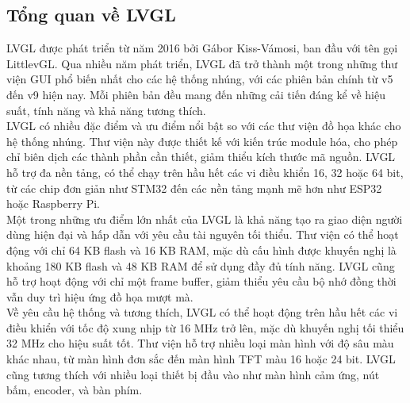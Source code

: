 \subsection{Tổng quan về LVGL}
\tab LVGL được phát triển từ năm 2016 bởi Gábor Kiss-Vámosi, ban đầu với tên gọi LittlevGL. Qua nhiều năm phát triển, LVGL đã trở thành một trong những thư viện GUI phổ biến nhất cho các hệ thống nhúng, với các phiên bản chính từ v5 đến v9 hiện nay. Mỗi phiên bản đều mang đến những cải tiến đáng kể về hiệu suất, tính năng và khả năng tương thích.\\
\tab LVGL có nhiều đặc điểm và ưu điểm nổi bật so với các thư viện đồ họa khác cho hệ thống nhúng. Thư viện này được thiết kế với kiến trúc module hóa, cho phép chỉ biên dịch các thành phần cần thiết, giảm thiểu kích thước mã nguồn. LVGL hỗ trợ đa nền tảng, có thể chạy trên hầu hết các vi điều khiển 16, 32 hoặc 64 bit, từ các chip đơn giản như STM32 đến các nền tảng mạnh mẽ hơn như ESP32 hoặc Raspberry Pi.\\
\tab Một trong những ưu điểm lớn nhất của LVGL là khả năng tạo ra giao diện người dùng hiện đại và hấp dẫn với yêu cầu tài nguyên tối thiểu. Thư viện có thể hoạt động với chỉ 64 KB flash và 16 KB RAM, mặc dù cấu hình được khuyến nghị là khoảng 180 KB flash và 48 KB RAM để sử dụng đầy đủ tính năng. LVGL cũng hỗ trợ hoạt động với chỉ một frame buffer, giảm thiểu yêu cầu bộ nhớ đồng thời vẫn duy trì hiệu ứng đồ họa mượt mà.\\
\tab Về yêu cầu hệ thống và tương thích, LVGL có thể hoạt động trên hầu hết các vi điều khiển với tốc độ xung nhịp từ 16 MHz trở lên, mặc dù khuyến nghị tối thiểu 32 MHz cho hiệu suất tốt. Thư viện hỗ trợ nhiều loại màn hình với độ sâu màu khác nhau, từ màn hình đơn sắc đến màn hình TFT màu 16 hoặc 24 bit. LVGL cũng tương thích với nhiều loại thiết bị đầu vào như màn hình cảm ứng, nút bấm, encoder, và bàn phím.

